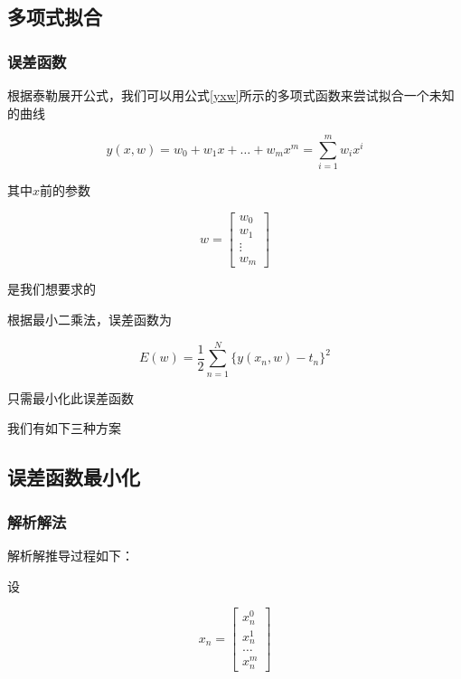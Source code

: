 \subsection{多项式拟合}

\subsubsection{误差函数}

根据泰勒展开公式，我们可以用公式\eqref{yxw}所示的多项式函数来尝试拟合一个未知的曲线

\begin{equation}
    y(x, w) = w_0 + w_1 x + \ldots + w_m x^m = \sum_{i = 1}^{m} w_i x^i
    \label{yxw}
\end{equation}

其中$x$前的参数

\begin{equation}
    w = 
    \begin{bmatrix}
        w_0 \\ w_1 \\ \vdots \\ w_m
    \end{bmatrix}
\end{equation}

是我们想要求的

根据最小二乘法，误差函数为

\begin{equation}
    E(w) = \frac{1}{2} \sum_{n=1}^{N} \{ y(x_n, w) - t_n \}^2
    \label{loss}
\end{equation}

只需最小化此误差函数

我们有如下三种方案

\subsection{误差函数最小化}

\subsubsection{解析解法}

解析解推导过程如下：

设

\begin{equation}
    x_n =
    \begin{bmatrix}
        x_n^0 \\ x_n^1 \\ \ldots \\ x_n^m
    \end{bmatrix}
\end{equation}

